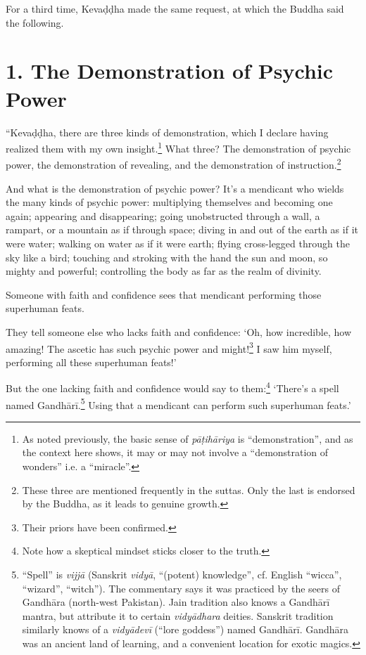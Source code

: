 \documentclass[12pt,openany]{book}%
\begin{document}
For a third time, \textsanskrit{Kevaḍḍha} made the same request, at which the Buddha said the following. 

\section*{1. The Demonstration of Psychic Power }

“\textsanskrit{Kevaḍḍha}, there are three kinds of demonstration, which I declare having realized them with my own insight.\footnote{As noted previously, the basic sense of \textit{\textsanskrit{pāṭihāriya}} is “demonstration”, and as the context here shows, it may or may not involve a “demonstration of wonders” i.e. a “miracle”. } What three? The demonstration of psychic power, the demonstration of revealing, and the demonstration of instruction.\footnote{These three are mentioned frequently in the suttas. Only the last is endorsed by the Buddha, as it leads to genuine growth. } 

And what is the demonstration of psychic power? It’s a mendicant who wields the many kinds of psychic power: multiplying themselves and becoming one again; appearing and disappearing; going unobstructed through a wall, a rampart, or a mountain as if through space; diving in and out of the earth as if it were water; walking on water as if it were earth; flying cross-legged through the sky like a bird; touching and stroking with the hand the sun and moon, so mighty and powerful; controlling the body as far as the realm of divinity. 

Someone with faith and confidence sees that mendicant performing those superhuman feats. 

They tell someone else who lacks faith and confidence: ‘Oh, how incredible, how amazing! The ascetic has such psychic power and might!\footnote{Their priors have been confirmed. } I saw him myself, performing all these superhuman feats!’ 

But the one lacking faith and confidence would say to them:\footnote{Note how a skeptical mindset sticks closer to the truth. } ‘There’s a spell named \textsanskrit{Gandhārī}.\footnote{“Spell” is \textit{\textsanskrit{vijjā}} (Sanskrit \textit{\textsanskrit{vidyā}}, “(potent) knowledge”, cf. English “wicca”, “wizard”, “witch”).  The commentary says it was practiced by the seers of \textsanskrit{Gandhāra} (north-west Pakistan). Jain tradition also knows a \textsanskrit{Gandhārī} mantra, but attribute it to certain \textit{\textsanskrit{vidyādhara}} deities. Sanskrit tradition similarly knows of a \textit{\textsanskrit{vidyādevī}} (“lore goddess”) named \textsanskrit{Gandhārī}. \textsanskrit{Gandhāra} was an ancient land of learning, and a convenient location for exotic magics. } Using that a mendicant can perform such superhuman feats.’ 
\end{document}
